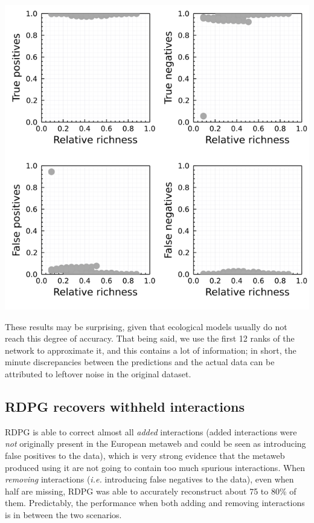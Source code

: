 \includegraphics[width=\textwidth]{./figures/supplementary/sensibility_species.png}

These results may be surprising, given that ecological models usually do
not reach this degree of accuracy. That being said, we use the first 12
ranks of the network to approximate it, and this contains a lot of
information; in short, the minute discrepancies between the predictions
and the actual data can be attributed to leftover noise in the original
dataset.

\subsection{RDPG recovers withheld
interactions}\label{rdpg-recovers-withheld-interactions}

RDPG is able to correct almost all \emph{added} interactions (added
interactions were \emph{not} originally present in the European metaweb
and could be seen as introducing false positives to the data), which is
very strong evidence that the metaweb produced using it are not going to
contain too much spurious interactions. When \emph{removing}
interactions (\emph{i.e.} introducing false negatives to the data), even
when half are missing, RDPG was able to accurately reconstruct about 75
to 80\% of them. Predictably, the performance when both adding and
removing interactions is in between the two scenarios.

